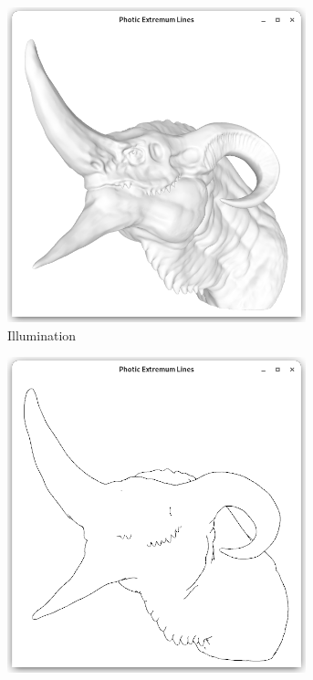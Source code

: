 \documentclass[9pt,fleqn,twoside,twocolumn]{stdglobal}
\begin{document}
  \begin{figure}
      \centering
      \begin{subfigure}[b]{0.24\textwidth}
        \centering
        \includegraphics[width=0.95\textwidth,trim={15px 15 15 50},clip]{images/dragon-head-viewer-shader.png}
        \caption{Illumination}
      \end{subfigure}%
      \hfill%
      \begin{subfigure}[b]{0.24\textwidth}
        \centering
        \includegraphics[width=0.95\textwidth,trim={15px 15 15 50},clip]{images/dragon-head-contours.png}

\end{subfigure}
\end{figure}
\end{document}
